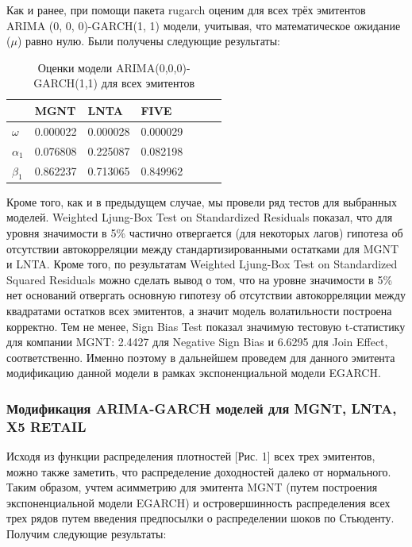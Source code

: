 \documentclass[a4paper,12pt,twoside]{article}
\begin{document}
Как и ранее, при помощи пакета rugarch оценим для всех трёх эмитентов ARIMA (0, 0, 0)-GARCH(1, 1) модели, учитывая, что математическое ожидание ($\mu$) равно нулю.
Были получены следующие результаты:

\begin{table}[!h]
\centering
\begin{tabular}{lllllll}
  \hline
          &  MGNT & LNTA &  FIVE \\
  \hline
  $\omega$ & 0.000022 &  0.000028 & 0.000029  \\
  $\alpha_1$ & 0.076808 &  0.225087 & 0.082198 \\
  $\beta_1$ & 0.862237 &  0.713065 & 0.849962 \\

  \hline
\end{tabular}
\caption{Оценки модели ARIMA(0,0,0)-GARCH(1,1) для всех эмитентов}
\end{table}

Кроме того, как и в предыдущем случае, мы провели ряд тестов для выбранных моделей. Weighted Ljung-Box Test on Standardized Residuals показал, что для уровня значимости в 5\% частично отвергается (для некоторых лагов) гипотеза об отсутствии автокорреляции между стандартизированными остатками для MGNT и LNTA. Кроме того, по результатам Weighted Ljung-Box Test on Standardized Squared Residuals можно сделать вывод о том, что на уровне значимости в 5\% нет оснований отвергать основную гипотезу об отсутствии автокорреляции между квадратами остатков всех эмитентов, а значит модель волатильности построена корректно.
Тем не менее, Sign Bias Test показал значимую тестовую t-статистику для компании MGNT: 2.4427 для Negative Sign Bias и 6.6295 для Join Effect, соответственно.
Именно поэтому в дальнейшем проведем для данного эмитента модификацию данной модели в рамках экспоненциальной модели EGARCH.

\subsubsection{Модификация ARIMA-GARCH моделей для MGNT, LNTA, X5 RETAIL}

Исходя из функции распределения плотностей [Рис. 1] всех трех эмитентов, можно также заметить, что распределение доходностей далеко от нормального.
Таким образом, учтем асимметрию для эмитента MGNT (путем построения экспоненциальной модели EGARCH) и островершинность распределения всех трех рядов путем введения предпосылки о распределении шоков по Стьюденту.
Получим следующие результаты:
\end{document}
